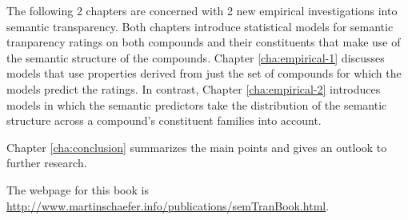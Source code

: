 The following 2 chapters are concerned with 2 new empirical investigations into
semantic transparency. Both chapters introduce statistical models for
semantic tranparency ratings on both compounds and their
constituents that make use of the semantic structure of the
compounds. Chapter \ref{cha:empirical-1} discusses models that use
properties derived from just the set of compounds for which the models
predict the ratings. In contrast, Chapter \ref{cha:empirical-2} introduces
models in which the semantic predictors take the distribution of the
semantic structure across a compound's constituent families into
account.

Chapter \ref{cha:conclusion} summarizes the main points and
gives an outlook to further research. 

The webpage for this book is
\url{http://www.martinschaefer.info/publications/semTranBook.html}.



